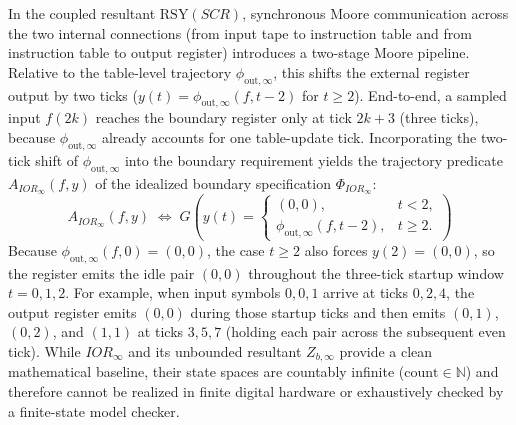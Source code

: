 In the coupled resultant $\mathrm{RSY}(SCR)$, synchronous Moore communication across the two internal connections (from input tape to instruction table and from instruction table to output register) introduces a two-stage Moore pipeline. Relative to the table-level trajectory $\phi_{\mathrm{out},\infty}$, this shifts the external register output by two ticks ($y(t)=\phi_{\mathrm{out},\infty}(f,t-2)$ for $t\ge 2$). End-to-end, a sampled input $f(2k)$ reaches the boundary register only at tick $2k+3$ (three ticks), because $\phi_{\mathrm{out},\infty}$ already accounts for one table-update tick. Incorporating the two-tick shift of $\phi_{\mathrm{out},\infty}$ into the boundary requirement yields the trajectory predicate $A_{IOR_\infty}(f,y)$ of the idealized boundary specification $\Phi_{IOR_\infty}$:
\begin{equation}
  A_{IOR_\infty}(f,y)
  \;\Longleftrightarrow\;
  G\left(
  y(t)=
  \begin{cases}
    (0,0), & t<2,\\
    \phi_{\mathrm{out},\infty}(f,t-2), & t\ge 2.
  \end{cases}
  \right)
  \label{eq:phi-ior-inf}
\end{equation}
Because $\phi_{\mathrm{out},\infty}(f,0)=(0,0)$, the case $t\ge 2$ also forces $y(2)=(0,0)$, so the register emits the idle pair $(0,0)$ throughout the three-tick startup window $t=0,1,2$. For example, when input symbols $0,0,1$ arrive at ticks $0,2,4$, the output register emits $(0,0)$ during those startup ticks and then emits $(0,1)$, $(0,2)$, and $(1,1)$ at ticks $3,5,7$ (holding each pair across the subsequent even tick). While $IOR_\infty$ and its unbounded resultant $Z_{b,\infty}$ provide a clean mathematical baseline, their state spaces are countably infinite ($\mathrm{count}\in\mathbb{N}$) and therefore cannot be realized in finite digital hardware or exhaustively checked by a finite-state model checker.

